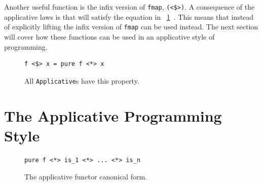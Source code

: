 Another useful function is the infix version of \texttt{fmap}, \texttt{(<\$>)}. A consequence of the applicative laws is that \DIFdelbegin {}\DIFdelend \DIFaddbegin {}\texttt{} \DIFaddend will satisfy the equation in  \DIFdelbegin {}\DIFdelend \DIFaddbegin {}\DIFaddend ~\ref{fmapLaw}~\DIFdelbegin {}\DIFdelend \DIFaddbegin {}\DIFaddend . This means that instead of explicitly lifting \DIFdelbegin {}\DIFdelend \DIFaddbegin {}\DIFaddend the infix version of \texttt{fmap} can be used instead. The next section will cover how these functions can be used in an applicative style of programming.

\begin{figure}[t]
\begin{lstlisting}
f <$> x = pure f <*> x
\end{lstlisting}
\caption{All \texttt{Applicative}s have this property.}
\label{fmapLaw}
\end{figure}

 


\section{The Applicative Programming Style}
\label{sec:appProgStyle}

\begin{figure}[t]
\begin{lstlisting}
pure f <*> is_1 <*> ... <*> is_n
\end{lstlisting}
\caption{The applicative functor \DIFaddbeginFL {}\DIFaddendFL canonical form.}
\label{canonForm}
\end{figure}

